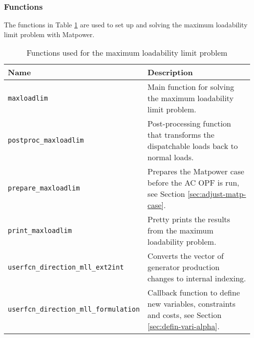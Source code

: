 \documentclass[12pt,a4]{article}
\newcommand*{\codemat}[1]{\texttt{#1}}
\newcommand*{\matpower}{{\sc Matpower}}
\begin{document}
\subsubsection{Functions}
\label{sec:functions}

The functions in Table \ref{tab:functions} are used to set up and solving the maximum loadability limit problem with \matpower{}.

\begin{table}[!h]
  \centering
  \begin{tabular}{lp{8cm}}
  \toprule
  Name  & Description \\
  \midrule
  \codemat{maxloadlim} & Main function for solving the maximum loadability limit problem.\\
  \codemat{postproc\_maxloadlim} & Post-processing function that transforms the dispatchable loads back to normal loads.\\
  \codemat{prepare\_maxloadlim} & Prepares the \matpower{} case before the AC OPF is run, see Section \ref{sec:adjust-matp-case}.\\
  \codemat{print\_maxloadlim} & Pretty prints the results from the maximum loadability problem.\\
  \codemat{userfcn\_direction\_mll\_ext2int} & Converts the vector of generator production changes to internal indexing.\\
  \codemat{userfcn\_direction\_mll\_formulation} & Callback function to define new variables, constraints and costs, see Section \ref{sec:defin-vari-alpha}. \\
  \bottomrule
  \end{tabular}
  \caption{Functions used for the maximum loadability limit problem}
  \label{tab:functions}
\end{table}
\end{document}
